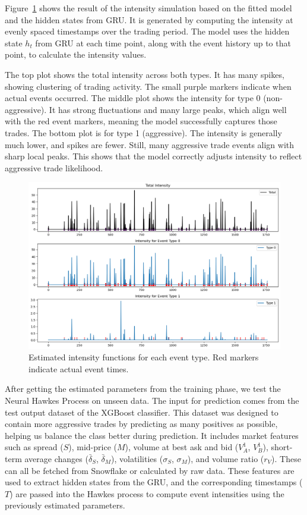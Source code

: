 Figure~\ref{fig:neuralhp-intensity} shows the result of the intensity simulation based on the fitted model and the hidden states from GRU. It is generated by computing the intensity at evenly spaced timestamps over the trading period. The model uses the hidden state \( h_t \) from GRU at each time point, along with the event history up to that point, to calculate the intensity values. 

The top plot shows the total intensity across both types. It has many spikes, showing clustering of trading activity. The small purple markers indicate when actual events occurred. The middle plot shows the intensity for type 0 (non-aggressive). It has strong fluctuations and many large peaks, which align well with the red event markers, meaning the model successfully captures those trades. The bottom plot is for type 1 (aggressive). The intensity is generally much lower, and spikes are fewer. Still, many aggressive trade events align with sharp local peaks. This shows that the model correctly adjusts intensity to reflect aggressive trade likelihood.

\begin{figure}[H]
    \centering
    \includegraphics[width=0.95\linewidth]{figures/hp_estimation.png}
    \caption{Estimated intensity functions for each event type. Red markers indicate actual event times.}
    \label{fig:neuralhp-intensity}
\end{figure}

After getting the estimated parameters from the training phase, we test the Neural Hawkes Process on unseen data. The input for prediction comes from the test output dataset of the XGBoost classifier. This dataset was designed to contain more aggressive trades by predicting as many positives as possible, helping us balance the class better during prediction. It includes market features such as spread ($S$), mid-price ($M$), volume at best ask and bid ($V_A^1$, $V_B^1$), short-term average changes ($\bar{\delta}_S$, $\bar{\delta}_M$), volatilities ($\sigma_S$, $\sigma_M$), and volume ratio ($r_V$). These can all be fetched from Snowflake or calculated by raw data. These features are used to extract hidden states from the GRU, and the corresponding timestamps ($T$) are passed into the Hawkes process to compute event intensities using the previously estimated parameters.

